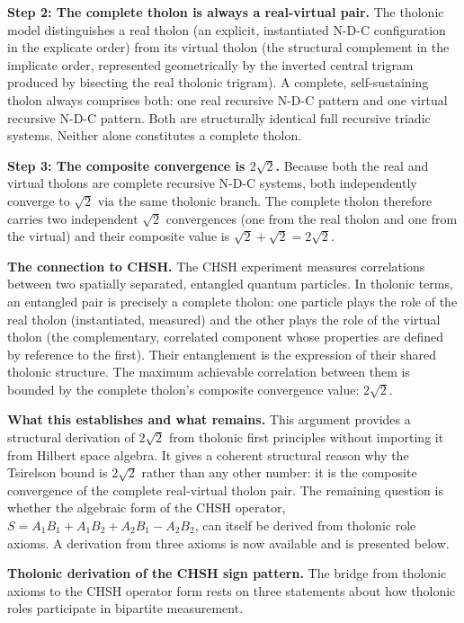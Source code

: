 \documentclass[12pt]{article}
\begin{document}
\textbf{Step 2: The complete tholon is always a real-virtual pair.} The
tholonic model distinguishes a real tholon (an explicit, instantiated
N-D-C configuration in the explicate order) from its virtual tholon (the
structural complement in the implicate order, represented geometrically
by the inverted central trigram produced by bisecting the real tholonic
trigram). A complete, self-sustaining tholon always comprises both: one
real recursive N-D-C pattern and one virtual recursive N-D-C pattern.
Both are structurally identical full recursive triadic systems. Neither
alone constitutes a complete tholon.

\textbf{Step 3: The composite convergence is \(2\sqrt{2}\).} Because
both the real and virtual tholons are complete recursive N-D-C systems,
both independently converge to \(\sqrt{2}\) via the same tholonic
branch. The complete tholon therefore carries two independent
\(\sqrt{2}\) convergences (one from the real tholon and one from the
virtual) and their composite value is
\(\sqrt{2} + \sqrt{2} = 2\sqrt{2}\).

\textbf{The connection to CHSH.} The CHSH experiment measures
correlations between two spatially separated, entangled quantum
particles. In tholonic terms, an entangled pair is precisely a complete
tholon: one particle plays the role of the real tholon (instantiated,
measured) and the other plays the role of the virtual tholon (the
complementary, correlated component whose properties are defined by
reference to the first). Their entanglement is the expression of their
shared tholonic structure. The maximum achievable correlation between
them is bounded by the complete tholon's composite convergence value:
\(2\sqrt{2}\).

\textbf{What this establishes and what remains.} This argument provides
a structural derivation of \(2\sqrt{2}\) from tholonic first principles
without importing it from Hilbert space algebra. It gives a coherent
structural reason why the Tsirelson bound is \(2\sqrt{2}\) rather than
any other number: it is the composite convergence of the complete
real-virtual tholon pair. The remaining question is whether the
algebraic form of the CHSH operator,
\(S = A_1B_1 + A_1B_2 + A_2B_1 - A_2B_2\), can itself be derived from
tholonic role axioms. A derivation from three axioms is now available
and is presented below.

\textbf{Tholonic derivation of the CHSH sign pattern.} The bridge from
tholonic axioms to the CHSH operator form rests on three statements
about how tholonic roles participate in bipartite measurement.
\end{document}
